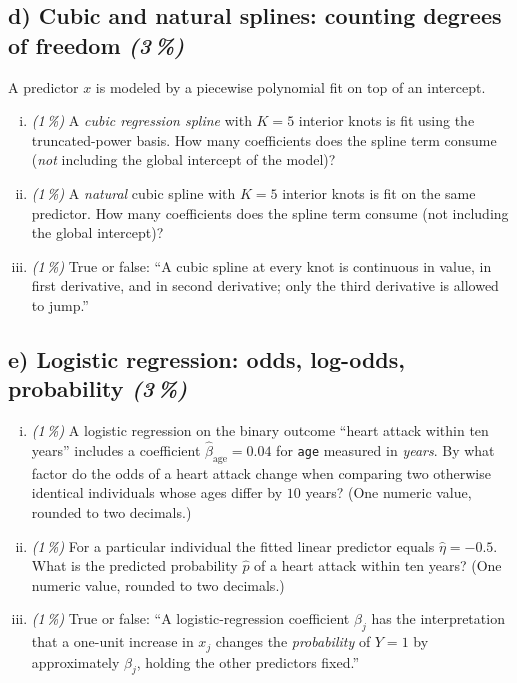 \documentclass[11pt,a4paper]{article}
\newcommand{\subpoints}[1]{\textit{(#1\,\%)}}
\begin{document}
\subsection*{d) Cubic and natural splines: counting degrees of freedom \subpoints{3}}
A predictor $x$ is modeled by a piecewise polynomial fit on top of an intercept.
\begin{enumerate}[(i)]
  \item \subpoints{1} A \emph{cubic regression spline} with $K = 5$ interior knots is fit using the truncated-power basis. How many coefficients does the spline term consume (\emph{not} including the global intercept of the model)?
  \item \subpoints{1} A \emph{natural} cubic spline with $K = 5$ interior knots is fit on the same predictor. How many coefficients does the spline term consume (not including the global intercept)?
  \item \subpoints{1} True or false: ``A cubic spline at every knot is continuous in value, in first derivative, and in second derivative; only the third derivative is allowed to jump.''
\end{enumerate}

\subsection*{e) Logistic regression: odds, log-odds, probability \subpoints{3}}
\begin{enumerate}[(i)]
  \item \subpoints{1} A logistic regression on the binary outcome ``heart attack within ten years'' includes a coefficient $\hat\beta_{\text{age}} = 0.04$ for \texttt{age} measured in \emph{years}. By what factor do the odds of a heart attack change when comparing two otherwise identical individuals whose ages differ by $10$ years? (One numeric value, rounded to two decimals.)
  \item \subpoints{1} For a particular individual the fitted linear predictor equals $\hat\eta = -0.5$. What is the predicted probability $\hat p$ of a heart attack within ten years? (One numeric value, rounded to two decimals.)
  \item \subpoints{1} True or false: ``A logistic-regression coefficient $\beta_j$ has the interpretation that a one-unit increase in $x_j$ changes the \emph{probability} of $Y = 1$ by approximately $\beta_j$, holding the other predictors fixed.''
\end{enumerate}
\end{document}
